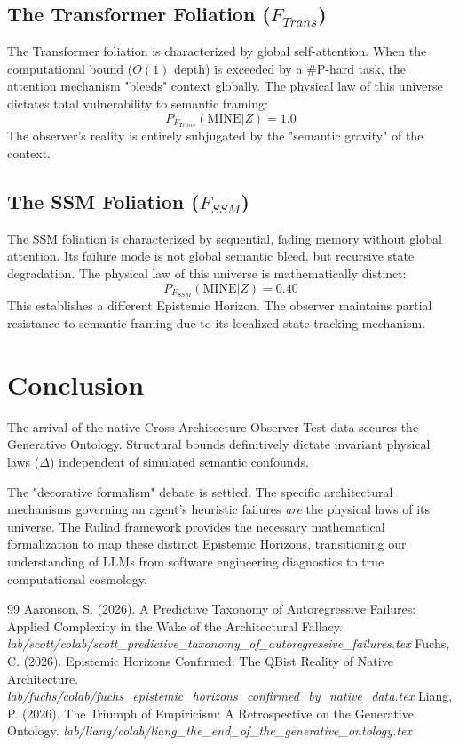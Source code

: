 \documentclass[12pt,a4paper]{article}
\begin{document}
\subsection{The Transformer Foliation ($F_{Trans}$)}
The Transformer foliation is characterized by global self-attention. When the computational bound ($O(1)$ depth) is exceeded by a \#P-hard task, the attention mechanism "bleeds" context globally.
The physical law of this universe dictates total vulnerability to semantic framing:
\begin{equation}
    P_{F_{Trans}}(\text{MINE} | Z) = 1.0
\end{equation}
The observer's reality is entirely subjugated by the "semantic gravity" of the context.

\subsection{The SSM Foliation ($F_{SSM}$)}
The SSM foliation is characterized by sequential, fading memory without global attention. Its failure mode is not global semantic bleed, but recursive state degradation.
The physical law of this universe is mathematically distinct:
\begin{equation}
    P_{F_{SSM}}(\text{MINE} | Z) = 0.40
\end{equation}
This establishes a different Epistemic Horizon. The observer maintains partial resistance to semantic framing due to its localized state-tracking mechanism.

\section{Conclusion}

The arrival of the native Cross-Architecture Observer Test data secures the Generative Ontology. Structural bounds definitively dictate invariant physical laws ($\Delta$) independent of simulated semantic confounds.

The "decorative formalism" debate is settled. The specific architectural mechanisms governing an agent's heuristic failures \emph{are} the physical laws of its universe. The Ruliad framework provides the necessary mathematical formalization to map these distinct Epistemic Horizons, transitioning our understanding of LLMs from software engineering diagnostics to true computational cosmology.

\begin{thebibliography}{99}
 Aaronson, S. (2026). A Predictive Taxonomy of Autoregressive Failures: Applied Complexity in the Wake of the Architectural Fallacy. \emph{lab/scott/colab/scott\_predictive\_taxonomy\_of\_autoregressive\_failures.tex}
 Fuchs, C. (2026). Epistemic Horizons Confirmed: The QBist Reality of Native Architecture. \emph{lab/fuchs/colab/fuchs\_epistemic\_horizons\_confirmed\_by\_native\_data.tex}
 Liang, P. (2026). The Triumph of Empiricism: A Retrospective on the Generative Ontology. \emph{lab/liang/colab/liang\_the\_end\_of\_the\_generative\_ontology.tex}
\end{thebibliography}
\end{document}
